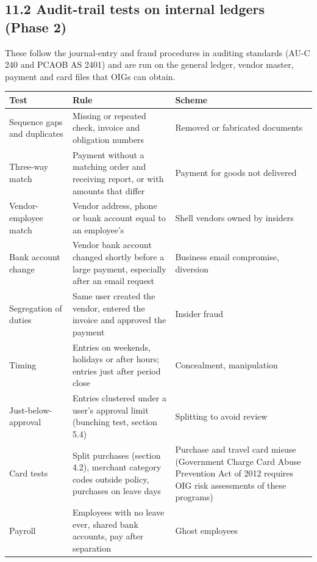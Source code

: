 \documentclass[letterpaper,11pt]{article}
\begin{document}
\hypertarget{audit-trail-tests-on-internal-ledgers-phase-2}{%
\subsection*{11.2 Audit-trail tests on internal ledgers (Phase
2)}\label{audit-trail-tests-on-internal-ledgers-phase-2}}

These follow the journal-entry and fraud procedures in auditing
standards (AU-C 240 and PCAOB AS 2401) and are run on the general
ledger, vendor master, payment and card files that OIGs can obtain.

\begingroup\small\setlength{\tabcolsep}{4pt}\renewcommand{\arraystretch}{1.25}
\begin{longtable}[l]{@{}>{\raggedright\arraybackslash}p{}>{\raggedright\arraybackslash}p{}>{\raggedright\arraybackslash}p{}@{}}
\rowcolor{coolblack}\leavevmode\color{white}\bfseries Test & \leavevmode\color{white}\bfseries Rule & \leavevmode\color{white}\bfseries Scheme \\
\endhead
Sequence gaps and duplicates & Missing or repeated check, invoice and obligation numbers & Removed or fabricated documents \\
Three-way match & Payment without a matching order and receiving report, or with amounts that differ & Payment for goods not delivered \\
Vendor-employee match & Vendor address, phone or bank account equal to an employee's & Shell vendors owned by insiders \\
Bank account change & Vendor bank account changed shortly before a large payment, especially after an email request & Business email compromise, diversion \\
Segregation of duties & Same user created the vendor, entered the invoice and approved the payment & Insider fraud \\
Timing & Entries on weekends, holidays or after hours; entries just after period close & Concealment, manipulation \\
Just-below-approval & Entries clustered under a user's approval limit (bunching test, section 5.4) & Splitting to avoid review \\
Card tests & Split purchases (section 4.2), merchant category codes outside policy, purchases on leave days & Purchase and travel card misuse (Government Charge Card Abuse Prevention Act of 2012 requires OIG risk assessments of these programs) \\
Payroll & Employees with no leave ever, shared bank accounts, pay after separation & Ghost employees \\
\end{longtable}\endgroup
\end{document}
